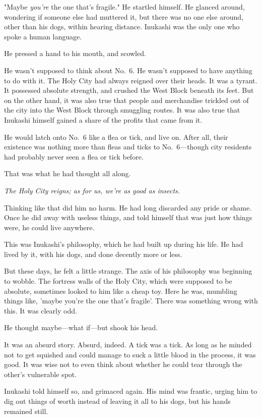 "Maybe \emph{you're} the one that's fragile." He startled himself. He glanced
around, wondering if someone else had muttered it, but there was no one
else around, other than his dogs, within hearing distance. Inukashi was
the only one who spoke a human language.

He pressed a hand to his mouth, and scowled.

He wasn't supposed to think about No.~6. He wasn't supposed to have
anything to do with it. The Holy City had always reigned over their
heads. It was a tyrant. It possessed absolute strength, and crushed the
West Block beneath its feet. But on the other hand, it was also true
that people and merchandise trickled out of the city into the West Block
through smuggling routes. It was also true that Inukashi himself gained
a share of the profits that came from it.

He would latch onto No.~6 like a flea or tick, and live on. After all,
their existence was nothing more than fleas and ticks to No.~6---though
city residents had probably never seen a flea or tick before.

That was what he had thought all along.

\emph{The Holy City reigns; as for us, we're as good as insects.}

Thinking like that did him no harm. He had long discarded any pride or
shame. Once he did away with useless things, and told himself that was
just how things were, he could live anywhere.

This was Inukashi's philosophy, which he had built up during his life.
He had lived by it, with his dogs, and done decently more or less.

But these days, he felt a little strange. The axis of his philosophy was
beginning to wobble. The fortress walls of the Holy City, which were
supposed to be absolute, sometimes looked to him like a cheap toy. Here
he was, mumbling things like, 'maybe you're the one that's fragile'.
There was something wrong with this. It was clearly odd.

He thought maybe---what if---but shook his head.

It was an absurd story. Absurd, indeed. A tick was a tick. As long as he
minded not to get squished and could manage to suck a little blood in
the process, it was good. It was wise not to even think about whether he
could tear through the other's vulnerable spot.

Inukashi told himself so, and grimaced again. His mind was frantic,
urging him to dig out things of worth instead of leaving it all to his
dogs, but his hands remained still.

